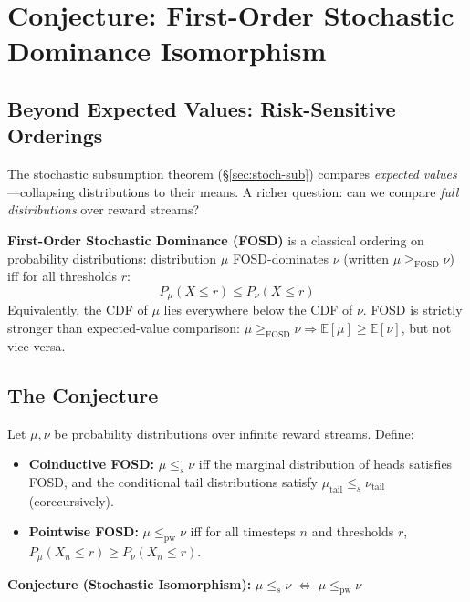\documentclass[9pt,a4paper]{article}
\theoremstyle{plain}
\theoremstyle{definition}
\theoremstyle{remark}
\begin{document}
\section{Conjecture: First-Order Stochastic Dominance Isomorphism}
\label{sec:fosd}

\subsection{Beyond Expected Values: Risk-Sensitive Orderings}

The stochastic subsumption theorem (\S\ref{sec:stoch-sub}) compares \emph{expected values}---collapsing distributions to their means. A richer question: can we compare \emph{full distributions} over reward streams?

\textbf{First-Order Stochastic Dominance (FOSD)} is a classical ordering on probability distributions: distribution $\mu$ FOSD-dominates $\nu$ (written $\mu \ge_{\text{FOSD}} \nu$) iff for all thresholds $r$:
\[
P_\mu(X \le r) \le P_\nu(X \le r)
\]
Equivalently, the CDF of $\mu$ lies everywhere below the CDF of $\nu$. FOSD is strictly stronger than expected-value comparison: $\mu \ge_{\text{FOSD}} \nu \Rightarrow \mathbb{E}[\mu] \ge \mathbb{E}[\nu]$, but not vice versa.

\subsection{The Conjecture}

Let $\mu, \nu$ be probability distributions over infinite reward streams. Define:
\begin{itemize}
\item \textbf{Coinductive FOSD:} $\mu \le_s \nu$ iff the marginal distribution of heads satisfies FOSD, and the conditional tail distributions satisfy $\mu_{\text{tail}} \le_s \nu_{\text{tail}}$ (corecursively).
\item \textbf{Pointwise FOSD:} $\mu \le_{\text{pw}} \nu$ iff for all timesteps $n$ and thresholds $r$, $P_\mu(X_n \le r) \ge P_\nu(X_n \le r)$.
\end{itemize}

\begin{center}
\textbf{Conjecture (Stochastic Isomorphism):} $\mu \le_s \nu \;\Longleftrightarrow\; \mu \le_{\text{pw}} \nu$
\end{center}
\end{document}
